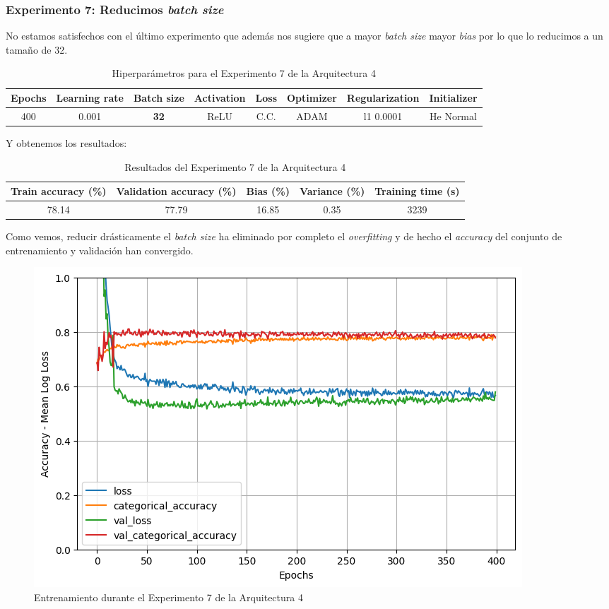 \documentclass{article}
\begin{document}
        \subsubsection{Experimento 7: Reducimos \textit{batch size}}
        \label{d-s-a4-e7}
			No estamos satisfechos con el \'ultimo experimento que adem\'as nos sugiere que a mayor \textit{batch size} mayor \textit{bias} por lo que lo reducimos a un tama\~no de 32.
			
			\begin{table}[!h]
				\begin{tabular}{|c|c|c|c|c|c|c|c|}
					\textbf{Epochs}&\textbf{Learning rate}&\textbf{Batch size}&\textbf{Activation}&\textbf{Loss}&\textbf{Optimizer}&\textbf{Regularization}  & \textbf{Initializer} \\ \hline
					400 & 0.001 & \textbf{32} & ReLU & C.C. & ADAM & l1 0.0001 & He Normal
				\end{tabular}
				\caption{Hiperpar\'ametros para el Experimento 7 de la Arquitectura 4}
				\label{tab:hip-d-a4-e7}
			\end{table}
			Y obtenemos los resultados:
			\begin{table}[!h]
				\begin{center}
					\begin{tabular}{| c | c | c | c | c |}
						\textbf{Train accuracy (\%)} & \textbf{Validation accuracy (\%)} & \textbf{Bias (\%)} & \textbf{Variance (\%)} & \textbf{Training time (s)} \\ \hline
						78.14 & 77.79 & 16.85 & 0.35 & 3239 \\ \hline
					\end{tabular}
					\caption{Resultados del Experimento 7 de la Arquitectura 4}
					\label{tab:res-d-a4-e7}
				\end{center}
			\end{table}
   
			Como vemos, reducir dr\'asticamente el \textit{batch size} ha eliminado por completo el \textit{overfitting} y de hecho el \textit{accuracy} del conjunto de entrenamiento y validaci\'on han convergido.
			\begin{figure}[!h]
				\begin{center}
					\includegraphics[scale=0.5]{d-tr-a4-e7.png}		
					\caption{Entrenamiento durante el Experimento 7 de la Arquitectura 4}	
					\label{d-tr-a4-e7}
				\end{center}
			\end{figure}
\end{document}
